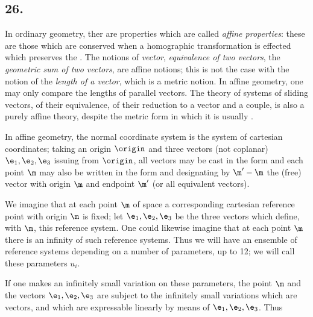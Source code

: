 \subsection*{26.}

In ordinary geometry, ther are properties which are called \textit{affine properties}: these are those which are conserved when a homographic transformation is effected which preserves the . The notions of \textit{vector}, \textit{equivalence of two vectors}, the \textit{geometric sum of two vectors}, are affine notions; this is not the case with the notion of the \textit{length of a vector}, which is a metric notion. In affine geometry, one may only compare the lengths of parallel vectors. The theory of systems of sliding vectors, of their equivalence, of their reduction to a vector and a couple, is also a purely affine theory, despite the metric form in which it is usually .

In affine geometry, the normal coordinate system is the system of cartesian coordinates; taking an origin $\origin$ and three vectors (not coplanar) $\e_1, \e_2, \e_3$ issuing from $\origin$, all vectors may be cast in the form
and each point $\m$ may also be written in the form
and designating by $\m'-\m$ the (free) vector with origin $\m$ and endpoint $\m'$ (or all equivalent vectors).

We imagine that at each point $\m$ of space a corresponding cartesian reference point with origin $\m$ is fixed; let $\e_1, \e_2, \e_3$ be the three vectors which define, with $\m$, this reference system. One could likewise imagine that at each point $\m$ there is an infinity of such reference systems. Thus we will have an ensemble of reference systems depending on a number of parameters, up to 12; we will call these parameters $u_i$.

If one makes an infinitely small variation on these parameters, the point $\m$ and the vectors $\e_1, \e_2, \e_3$ are subject to the infinitely small variations which are vectors, and which are expressable linearly by means of $\e_1, \e_2, \e_3$. Thus

